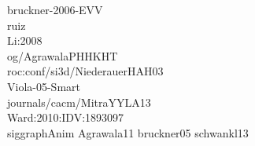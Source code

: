 %
%
%
%
bruckner-2006-EVV\cite{proc:bruckner-2006-EVV}\\
ruiz \cite{proc:ruiz-2008-SEV} \\
Li:2008\cite{proc:Li:2008:AGI} \\
og/AgrawalaPHHKHT\cite{journals/tog/AgrawalaPHHKHT03}\\
roc:conf/si3d/NiederauerHAH03\cite{proc:conf/si3d/NiederauerHAH03}\\
Viola-05-Smart\cite{Viola-05-Smart}\\
journals/cacm/MitraYYLA13\cite{journals/cacm/MitraYYLA13}\\
Ward:2010:IDV:1893097\cite{Ward:2010:IDV:1893097}\\
siggraphAnim\cite{misc:siggraphAnim}
Agrawala11\cite{Agrawala:2011:DPV:1924421.1924439}
bruckner05\cite{bruckner-2005-VIS}
schwankl13\cite{schwankl-2013-smis}
